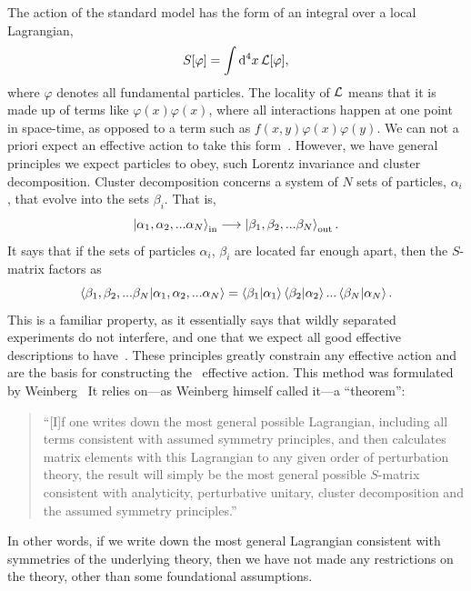 The action of the standard model has the form of an integral over a local Lagrangian,
\begin{equation}
    S[\varphi] = \int \dd^4 x \, \mathcal{L}[\varphi],
\end{equation}
where $\varphi$ denotes all fundamental particles.
The locality of $\mathcal{L}$ means that it is made up of terms like $\varphi(x) \varphi(x)$, where all interactions happen at one point in space-time, as opposed to a term such as $f(x, y)\varphi(x) \varphi(y)$.
We can not a priori expect an effective action to take this form~\cite{Schwartz:QFT}.
However, we have general principles we expect particles to obey, such Lorentz invariance and cluster decomposition.
Cluster decomposition concerns a system of $N$ sets of particles, $\alpha_i$, that evolve into the sets $\beta_i$.
That is,
\begin{equation}
    \ket{\alpha_1, \alpha_2, ... \alpha_N}_\text{in}
    \longrightarrow
    \ket{\beta_1, \beta_2, ... \beta_N}_\text{out}.
\end{equation}
It says that if the sets of particles $\alpha_i$, $\beta_i$ are located far enough apart, then the $S$-matrix factors as
\begin{equation}
    {\braket{\beta_1, \beta_2, ... \beta_N}{\alpha_1, \alpha_2, ... \alpha_N}}
    =
    \braket{\beta_1}{\alpha_1}\braket{\beta_2}{\alpha_2}... \braket{\beta_N}{\alpha_N}.
\end{equation}
This is a familiar property, as it essentially says that wildly separated experiments do not interfere, and one that we expect all good effective descriptions to have~\cite{weinberg_1995,weinberg_1996_vol2}.
These principles greatly constrain any effective action and are the basis for constructing the \chpt\, effective action.
This method was formulated by Weinberg~\cite{WeinbergPhenom} 
It relies on---as Weinberg himself called it---a ``theorem'':
\begin{quote}
    ``[I]f one writes down the most general possible Lagrangian, including all terms consistent with assumed symmetry principles, and then calculates matrix elements with this Lagrangian to any given order of perturbation theory, the result will simply be the most general possible $S$-matrix consistent with analyticity, perturbative unitary, cluster decomposition and the assumed symmetry principles.'' \cite{WeinbergPhenom}
\end{quote}
In other words, if we write down the most general Lagrangian consistent with symmetries of the underlying theory, then we have not made any restrictions on the theory, other than some foundational assumptions.
